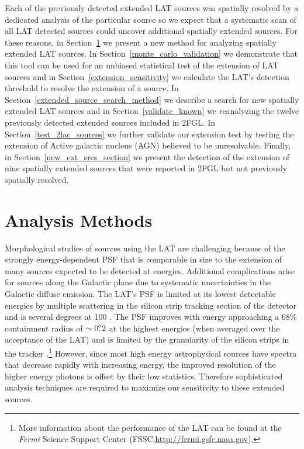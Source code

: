 \documentclass[12pt,preprint]{aastex}
\newcommand{\mev}{\text{MeV}\xspace}
\newcommand{\gev}{\text{GeV}\xspace}
\newcommand{\fermi}{\textit{Fermi}\xspace}
\begin{document}
{Each of the previously detected extended LAT sources was spatially
resolved by a dedicated analysis of the particular source so
we expect that a systematic scan of all LAT detected sources
could uncover additional spatially extended sources.  For these
reasons, in Section~\ref{analysis_methods_section} we present
a new method for analyzing spatially extended LAT sources. In
Section~\ref{monte_carlo_validation} we demonstrate that this tool
can be used for an unbiased statistical test of the extension of
LAT sources and in Section~\ref{extension_sensitivity} we calculate
the LAT's detection threshold to resolve the extension of a source.
In Section~\ref{extended_source_search_method} we describe a search for
new spatially extended LAT sources and in Section~\ref{validate_known}
we reanalyzing the twelve previously detected extended sources
included in 2FGL.  In Section~\ref{test_2lac_sources} we further
validate our extension test by testing the extension of Active
galactic nucleus (AGN) believed to be unresolvable. Finally, in
Section~\ref{new_ext_srcs_section} we present the detection of the
extension of nine spatially extended sources that were reported in 2FGL
but not previously spatially resolved.

}

\section{Analysis Methods}
\label{analysis_methods_section}

Morphological studies of sources using the LAT are challenging
because of the strongly energy-dependent PSF that is comparable in
size to the extension of many sources expected to be detected at
\gev energies.  Additional complications arise for sources along
the Galactic plane due to systematic uncertainties in the Galactic
diffuse emission.  The LAT's PSF is limited at its lowest detectable
energies by multiple scattering in the silicon strip tracking section
of the detector and is several degrees at 100 \mev.  The PSF improves
with energy approaching a 68\% containment radius of $\sim0\mbox{$.\!\!^\circ$}2$ at
the highest energies (when averaged over the acceptance of the LAT)
and is limited by the granularity of the silicon strips in the tracker
\citep{atwood_LAT_mission,on_orbit_calibration,lat_on_orbit_psf}.\footnote{More
information about the performance of the LAT can be found at the \fermi
Science Support Center (FSSC,\url{http://fermi.gsfc.nasa.gov}).} However,
since most high energy astrophysical sources have spectra that decrease
rapidly with increasing energy, the improved resolution of the higher
energy photons is offset by their low statistics. Therefore sophisticated
analysis techniques are required to maximize our sensitivity
to these extended sources.
\end{document}

